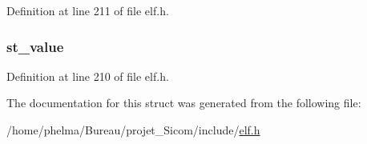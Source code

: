 Definition at line 211 of file elf.\-h.

\hypertarget{struct_elf32___sym_ab32ed2a85ba73e6491537c12da094793}{
\subsubsection[{st\-\_\-value}]{ st\-\_\-value}}\label{struct_elf32___sym_ab32ed2a85ba73e6491537c12da094793}


Definition at line 210 of file elf.\-h.



The documentation for this struct was generated from the following file\-:\begin{DoxyCompactItemize}
\item 
/home/phelma/\-Bureau/projet\-\_\-\-Sicom/include/\hyperlink{elf_8h}{elf.\-h}\end{DoxyCompactItemize}
